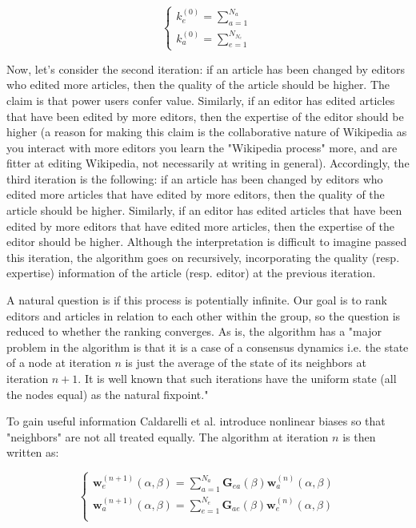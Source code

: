 \begin{equation}
\begin{cases}
 k_{e}^{(0)} = \sum_{a=1}^{N_{a}}\\
 k_{a}^{(0)} = \sum_{e=1}^{N_{N_{e}}}
\end{cases}
\label{HHinit}
\end{equation}

Now, let's consider the second iteration:  if an article has been changed by editors who edited more articles, then the quality of the article should be higher. The claim is that power users confer value. Similarly, if an editor has edited articles that have been edited by more editors, then the expertise of the editor should be higher (a reason for making this claim is the collaborative nature of Wikipedia as you interact with more editors you learn the "Wikipedia process" more, and are fitter at editing Wikipedia, not necessarily at writing in general). 
Accordingly, the third iteration is the following: if an article has been changed by editors who edited more articles that have edited by more editors, then the quality of the article should be higher. Similarly, if an editor has edited articles that have been edited by more editors that have edited more articles, then the expertise of the editor should be higher. Although the interpretation is difficult to imagine passed this iteration, the algorithm goes on recursively, incorporating the quality (resp. expertise) information of the article (resp. editor) at the previous iteration.

A natural question is if this process is potentially infinite. Our goal is to rank editors and articles in relation to each other within the group, so the question is reduced to whether the ranking converges. As is, the algorithm
has a "major problem in the algorithm is that it is a case of a
consensus dynamics i.e. the state of a node at iteration $n$ is just
the average of the state of its neighbors at iteration $n+1$. It is well
known that such iterations have the uniform state (all the nodes
equal) as the natural fixpoint." \cite{caldarelli2012network}

To gain useful information Caldarelli et al. introduce nonlinear biases so that "neighbors" are not all treated equally. The algorithm at iteration $n$ is then written as:

\begin{equation}
\begin{cases}
 \mathbf{w}^{(n+1)}_e (\alpha,\beta) = \sum_{a=1}^{N_a}  \mathbf{G}_{ea}(\beta) \mathbf{w}^{(n)}_a (\alpha,\beta)\\
\mathbf{w}^{(n+1)}_a (\alpha,\beta) = \sum_{e=1}^{N_e}  \mathbf{G}_{ae}(\beta) \mathbf{w}^{(n)}_e (\alpha,\beta)\\
\end{cases}
\label{random_walker}
\end{equation}

